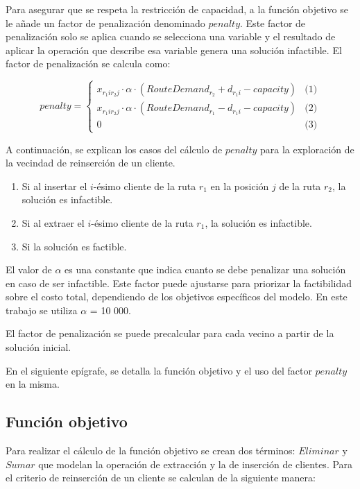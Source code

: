 \documentclass[12pt]{report}
\begin{document}
    Para asegurar que se respeta la restricción de capacidad, a la función objetivo se le añade un factor de penalización denominado $penalty$. Este factor de penalización solo se aplica cuando se selecciona una variable y el resultado de aplicar la operación que describe esa variable genera una solución infactible. El factor de penalización se calcula como:

    \[
    penalty =
    \begin{cases}
    	x_{r_1ir_2j} \cdot \alpha \cdot ( RouteDemand_{r_2} + d_{r_1i} - capacity) & \text{(1)} \\
    	x_{r_1ir_2j} \cdot \alpha \cdot (RouteDemand_{r_1} - d_{r_1i} - capacity) & \text{(2)} \\
    	0 & \text{(3)}
    \end{cases}
    \]

    A continuación, se explican los casos del cálculo de $penalty$ para la exploración de la vecindad de reinserción de un cliente.

    \begin{enumerate}
    	\item Si al insertar el $i$-ésimo cliente de la ruta $r_1$ en la posición $j$ de la ruta $r_2$, la solución es infactible.
    	\item Si al extraer el $i$-ésimo cliente de la ruta $r_1$, la solución es infactible.
    	\item Si la solución es factible.
    \end{enumerate}
    El valor de $\alpha$ es una constante que indica cuanto se debe penalizar una solución en caso de ser infactible. Este factor puede ajustarse para priorizar la factibilidad sobre el costo total, dependiendo de los objetivos específicos del modelo. En este trabajo se utiliza $\alpha$ = 10 000.

    El factor de penalización se puede precalcular para cada vecino a partir de la solución inicial.

    En el siguiente epígrafe, se detalla la función objetivo y el uso del factor $penalty$ en la misma.

    \subsection{Función objetivo}
    Para realizar el cálculo de la función objetivo se crean dos términos: $Eliminar$ y $Sumar$ que modelan la operación de extracción y la de inserción de clientes. Para el criterio de reinserción de un cliente se calculan de la siguiente manera:
\end{document}
